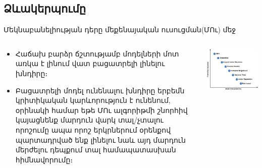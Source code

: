 \documentclass[aspectratio=169]{beamer}
\begin{document}
\subsection{Ձևակերպումը}
\begin{frame}{Մեկնաբանելիության դերը մեքենայական ուսուցման(ՄՈւ) մեջ}
\begin{columns}
  \begin{column}{0.5\textwidth}
    \begin{itemize}
      \item Հաճախ բարձր ճշտությամբ մոդելների մոտ առկա է լինում վատ բացատրելի լինելու խնդիրը։
      \pause
      \item Բացատրելի մոդել ունենալու խնդիրը երբեմն կրիտիկական կարևորություն է ունենում, օրինակի համար եթե ՄՈւ ալգորիթմի շնորհիվ կայացնենք մարդուն վարկ տալ/չտալու որոշումը ապա որոշ երկրներում օրենքով պարտադրված ենք լինելու նաև այդ մարդուն մերժելու դեպքում տալ համապատասխան հիմնավորումը։
    \end{itemize}
  \end{column}
  \pause
  \begin{column}{0.5\textwidth}
    \begin{overprint}
        \includegraphics[width=\textwidth]{"../../fig/interp_over_power.jpg"}

\end{overprint}
\end{column}
\end{columns}
\end{frame}
\end{document}
